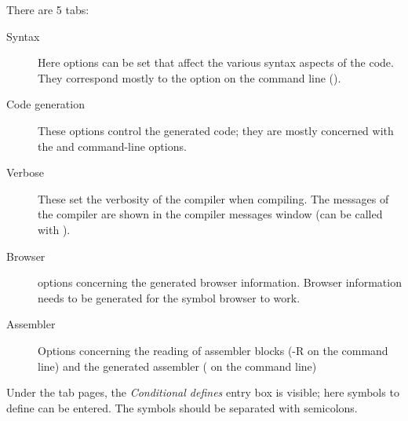 There are 5 tabs:
\begin{description}
\item[Syntax] Here options can be set that affect the various syntax aspects
of the code. They correspond mostly to the  option on the command
line ().
\item[Code generation] These options control the generated code; they are
mostly concerned with the  and  command-line options.
\item[Verbose] These set the verbosity of the compiler when compiling. The
messages of the compiler are shown in the compiler messages window (can be
called with ).
\item[Browser] options concerning the generated browser information. Browser
information needs to be generated for the symbol browser to work.
\item[Assembler] Options concerning the reading of assembler blocks (-R on
the command line) and the generated assembler ( on the command line)
\end{description}

Under the tab pages, the {\em Conditional defines} entry box is visible;
here symbols to define can be entered. The symbols should be separated with
semicolons.

